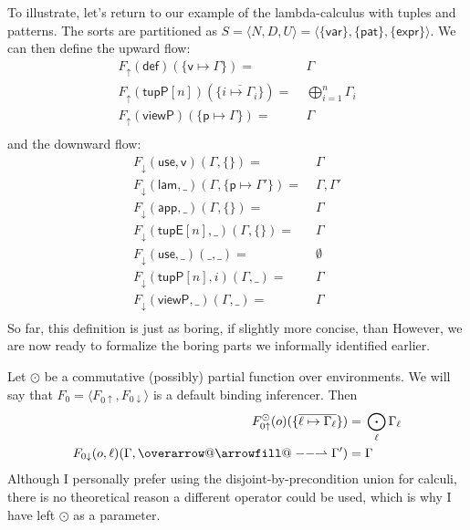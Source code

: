 \documentclass[11pt]{article} %
\makeatletter
\theoremstyle{definition}
\def\rightharpoonupfill@{\arrowfill@\relbar\relbar\rightharpoonup}
\newcommand{\harpvec}{%
   \mathpalette{\overarrow@\rightharpoonupfill@}}
\makeatother
\begin{document}
To illustrate, let's return to our example of the lambda-calculus with tuples and patterns.
The sorts are partitioned as $S = \langle N, D, U \rangle = \langle \{\mathsf{var}\}, \{\mathsf{pat}\}, \{\mathsf{expr}\} \rangle$.
We can then define the upward flow:
\begin{align*}
F_\uparrow(\mathsf{def})(\{\mathsf{v}\mapsto\Gamma\}) =\;& \Gamma \\
F_\uparrow(\mathsf{tupP}[n])(\{\overline{i\mapsto\Gamma_i}\}) =\;& \bigoplus\limits_{i = 1}^n\Gamma_i \\
F_\uparrow(\mathsf{viewP})(\{\mathsf{p}\mapsto\Gamma\}) =\;& \Gamma \\
\end{align*}
and the downward flow:
\begin{align*}
F_\downarrow(\mathsf{use}, \mathsf{v})(\Gamma, \{\}) =\;& \Gamma \\
F_\downarrow(\mathsf{lam}, \_)(\Gamma, \{\mathsf{p} \mapsto \Gamma'\}) =\;& \Gamma,\Gamma' \\
F_\downarrow(\mathsf{app}, \_)(\Gamma, \{\}) =\;& \Gamma \\
F_\downarrow(\mathsf{tupE}[n], \_)(\Gamma, \{\}) =\;& \Gamma \\
F_\downarrow(\mathsf{use}, \_)(\_, \_) =\;& \emptyset \\
F_\downarrow(\mathsf{tupP}[n], i)(\Gamma, \_) =\;& \Gamma \\
F_\downarrow(\mathsf{viewP}, \_)(\Gamma, \_) =\;& \Gamma \\
\end{align*}
So far, this definition is just as boring, if slightly more concise, than 
However, we are now ready to formalize the boring parts we informally identified earlier.


Let $\odot$ be a commutative (possibly) partial function over environments.
We will say that $F_0 = \langle F_{0\uparrow}, F_{0\downarrow} \rangle$ is a default binding inferencer.
Then
\begin{align*}
F_{0\uparrow}^\odot(o)(\{\overline{\ell \mapsto \Gamma_\ell}\}) =\;& \bigodot\limits_\ell \Gamma_\ell \\
F_{0\downarrow}(o, \ell)(\Gamma, \harpvec{\Gamma'}) =\;& \Gamma \\
\end{align*}
Although I personally prefer using the disjoint-by-precondition union for calculi, there is no theoretical reason a different operator could be used, which is why I have left $\odot$ as a parameter.
\end{document}
